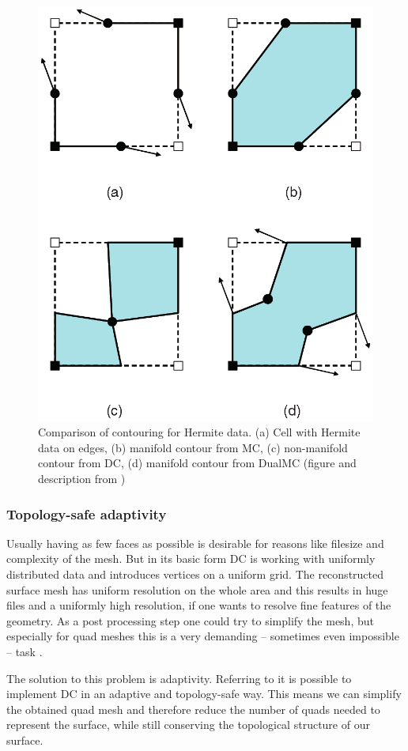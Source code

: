\begin{figure}
\begin{center}
\includegraphics[width=.3 \textwidth]{Pictures/SurfaceReconstruction/ManifoldDC.png}
\end{center}
\label{fig:manifold}
\caption{Comparison of contouring for Hermite data. (a) Cell with Hermite data on edges, (b) manifold contour from \acs{MC}, (c) non-manifold contour from \acs{DC}, (d) manifold contour from \acs{DualMC} (figure and description from \cite{Schaefer2007})}
\end{figure}

\subsubsection{Topology-safe adaptivity}
Usually having as few faces as possible is desirable for reasons like filesize and complexity of the mesh. But in its basic form \ac{DC} is working with uniformly distributed data and introduces vertices on a uniform grid. The reconstructed surface mesh has uniform resolution on the whole area and this results in huge files and a uniformly high resolution, if one wants to resolve fine features of the geometry. As a post processing step one could try to simplify the mesh, but especially for \ac{quad} meshes this is a very demanding -- sometimes even impossible -- task \cite{Puppo2010}.

The solution to this problem is adaptivity. Referring to \cite{Hermite2002} it is possible to implement \ac{DC} in an adaptive and topology-safe way. This means we can simplify the obtained \ac{quad} mesh and therefore reduce the number of \acp{quad} needed to represent the surface, while still conserving the topological structure of our surface.
